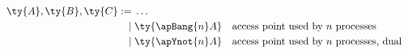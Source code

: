 \begin{definition}[Types]\label{def:safeap-types}
  \begin{gather*}
    \begin{aligned}
      \ty{A}, \ty{B}, \ty{C}
           :=& \; \dots
      \\ \mid& \; \ty{\apBang{n}A} &&\text{access point used by $n$ processes}
      \\ \mid& \; \ty{\apYnot{n}A} &&\text{access point used by $n$ processes, dual}
    \end{aligned}
  \end{gather*}
\end{definition}
